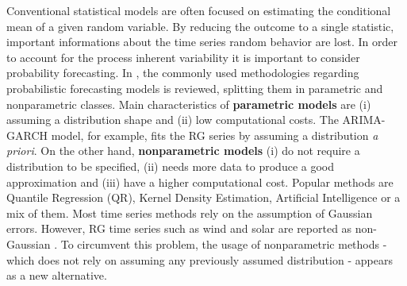 
Conventional statistical models are often focused on estimating the conditional mean of a given random variable. %
By reducing the outcome to a single statistic, important informations about the time series random behavior are lost. In order to account for the process inherent variability it is important to consider probability forecasting.
In \cite{zhang_review_2014}, the commonly used methodologies regarding probabilistic forecasting models is reviewed, splitting them in parametric and nonparametric classes. Main characteristics of \textbf{parametric models} are (i) assuming a distribution shape and (ii) low computational costs. The ARIMA-GARCH model, for example, fits the RG series by assuming a distribution \textit{a priori}. On the other hand, \textbf{nonparametric models} (i) do not require a distribution to be specified, (ii) needs more data to produce a good approximation and (iii) have a higher computational cost. Popular methods are Quantile Regression (QR), Kernel Density Estimation,  Artificial Intelligence or a mix of them.
Most time series methods rely on the assumption of Gaussian errors. However, RG time series such as wind and solar are reported as non-Gaussian \cite{bessa2012time,jeon2012using,taylor2015forecasting,Wan2017}. To circumvent this problem, the usage of nonparametric methods - which does not rely on assuming any previously assumed distribution - appears as a new alternative. 


